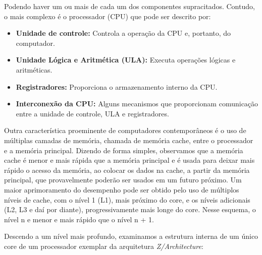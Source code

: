 \documentclass{article}
\begin{document}
Podendo haver um ou mais de cada um dos componentes supracitados. Contudo, o
mais complexo é o processador (CPU) que pode ser descrito por:

\begin{itemize}
    \item \textbf{Unidade de controle:} Controla a operação da CPU e, portanto,
        do computador.
    \item \textbf{Unidade Lógica e Aritmética (ULA):} Executa operações
        lógicas e aritméticas.
    \item \textbf{Registradores:} Proporciona o armazenamento interno da CPU.
    \item \textbf{Interconexão da CPU:} Alguns mecanismos que proporcionam
        comunicação entre a unidade de controle, ULA e registradores.
\end{itemize}

Outra característica proeminente de computadores contemporâneos é o uso de
múltiplas camadas de memória, chamada de memória cache, entre o processador e a
memória principal. Dizendo de forma simples, observamos que a memória cache é
menor e mais rápida que a memória principal e é usada para deixar mais rápido o
acesso da memória, ao colocar os dados na cache, a partir da memória principal,
que provavelmente poderão ser usados em um futuro próximo. Um maior
aprimoramento do desempenho pode ser obtido pelo uso de múltiplos níveis de
cache, com o nível 1 (L1), mais próximo do core, e os níveis adicionais (L2, L3
e daí por diante), progressivamente mais longe do core. Nesse esquema, o nível
n e menor e mais rápido que o nível n + 1.

Descendo a um nível mais profundo, examinamos a estrutura interna de um único
core de um processador exemplar da arquitetura \textit{Z/Architecture}:
\end{document}
